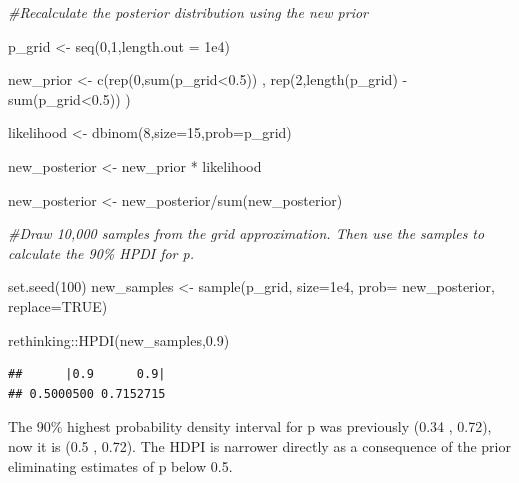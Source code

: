 \documentclass[
]{book}
\newenvironment{Shaded}{\begin{snugshade}}{\end{snugshade}}
\newcommand{\AttributeTok}[1]{\textcolor[rgb]{0.77,0.63,0.00}{#1}}
\newcommand{\CommentTok}[1]{\textcolor[rgb]{0.56,0.35,0.01}{\textit{#1}}}
\newcommand{\ConstantTok}[1]{\textcolor[rgb]{0.00,0.00,0.00}{#1}}
\newcommand{\DecValTok}[1]{\textcolor[rgb]{0.00,0.00,0.81}{#1}}
\newcommand{\FloatTok}[1]{\textcolor[rgb]{0.00,0.00,0.81}{#1}}
\newcommand{\FunctionTok}[1]{\textcolor[rgb]{0.00,0.00,0.00}{#1}}
\newcommand{\NormalTok}[1]{#1}
\newcommand{\OtherTok}[1]{\textcolor[rgb]{0.56,0.35,0.01}{#1}}
\newcommand{\SpecialCharTok}[1]{\textcolor[rgb]{0.00,0.00,0.00}{#1}}
\begin{document}
\begin{Shaded}
\begin{Highlighting}[]
\CommentTok{\#Recalculate the posterior distribution using the new prior}

\NormalTok{p\_grid }\OtherTok{\textless{}{-}} \FunctionTok{seq}\NormalTok{(}\DecValTok{0}\NormalTok{,}\DecValTok{1}\NormalTok{,}\AttributeTok{length.out =} \FloatTok{1e4}\NormalTok{)}

\NormalTok{new\_prior }\OtherTok{\textless{}{-}} \FunctionTok{c}\NormalTok{(}\FunctionTok{rep}\NormalTok{(}\DecValTok{0}\NormalTok{,}\FunctionTok{sum}\NormalTok{(p\_grid}\SpecialCharTok{\textless{}}\FloatTok{0.5}\NormalTok{)) , }\FunctionTok{rep}\NormalTok{(}\DecValTok{2}\NormalTok{,}\FunctionTok{length}\NormalTok{(p\_grid) }\SpecialCharTok{{-}} \FunctionTok{sum}\NormalTok{(p\_grid}\SpecialCharTok{\textless{}}\FloatTok{0.5}\NormalTok{)) )}

\NormalTok{likelihood }\OtherTok{\textless{}{-}} \FunctionTok{dbinom}\NormalTok{(}\DecValTok{8}\NormalTok{,}\AttributeTok{size=}\DecValTok{15}\NormalTok{,}\AttributeTok{prob=}\NormalTok{p\_grid)}

\NormalTok{new\_posterior }\OtherTok{\textless{}{-}}\NormalTok{ new\_prior }\SpecialCharTok{*}\NormalTok{ likelihood}

\NormalTok{new\_posterior }\OtherTok{\textless{}{-}}\NormalTok{ new\_posterior}\SpecialCharTok{/}\FunctionTok{sum}\NormalTok{(new\_posterior)}


\CommentTok{\#Draw 10,000 samples from the grid approximation. Then use the samples to calculate the 90\% HPDI for p.}

\FunctionTok{set.seed}\NormalTok{(}\DecValTok{100}\NormalTok{)}
\NormalTok{new\_samples }\OtherTok{\textless{}{-}} \FunctionTok{sample}\NormalTok{(p\_grid, }\AttributeTok{size=}\FloatTok{1e4}\NormalTok{, }\AttributeTok{prob=}\NormalTok{ new\_posterior, }\AttributeTok{replace=}\ConstantTok{TRUE}\NormalTok{)}

\NormalTok{rethinking}\SpecialCharTok{::}\FunctionTok{HPDI}\NormalTok{(new\_samples,}\FloatTok{0.9}\NormalTok{)}
\end{Highlighting}
\end{Shaded}

\begin{verbatim}
##      |0.9      0.9| 
## 0.5000500 0.7152715
\end{verbatim}

The 90\% highest probability density interval for p was previously (0.34 , 0.72), now it is (0.5 , 0.72). The HDPI is narrower directly as a consequence of the prior eliminating estimates of p below 0.5.
\end{document}
